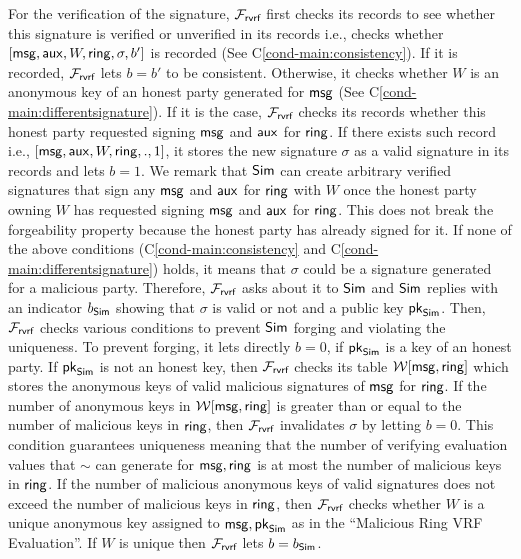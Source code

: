 For the verification of the signature, $ \mathcal{F}_{\textsf{rvrf}} $  first checks its records to see whether this signature is verified or unverified in its records i.e., checks  whether $ [\mathsf{msg},\mathsf{aux},W,\mathsf{ring},\sigma, b'] $ is recorded (See  C\ref{cond-main:consistency}). If it is recorded, $ \mathcal{F}_{\textsf{rvrf}} $ lets  $ b = b' $ to be consistent. Otherwise, it checks whether $ W $ is an anonymous key of an honest party generated for $ \mathsf{msg} $ (See C\ref{cond-main:differentsignature}). If it is the case, $ \mathcal{F}_{\textsf{rvrf}} $ checks  its records whether this honest party requested signing  $ \mathsf{msg} $ and $ \mathsf{aux} $ for $ \mathsf{ring} $.  If there exists such record i.e., $ [\mathsf{msg}, \mathsf{aux}, W, \mathsf{ring}, ., 1] $, it stores the new signature $ \sigma $ as a valid signature in its records and lets $ b = 1 $. We remark that $ \mathsf{Sim} $ can create arbitrary verified signatures that sign any $ \mathsf{msg} $ and $ \mathsf{aux} $ for $ \mathsf{ring} $ with $ W $ once the honest party owning $ W $ has requested signing $ \mathsf{msg} $ and $ \mathsf{aux} $ for $ \mathsf{ring} $. This does not break the forgeability property because the honest party has already signed for it. 
If none of the above conditions (C\ref{cond-main:consistency} and C\ref{cond-main:differentsignature}) holds, it means that $ \sigma $ could be a signature generated for a malicious party. Therefore, $ \mathcal{F}_{\textsf{rvrf}} $ asks about it to $ \mathsf{Sim} $ and $ \mathsf{Sim} $ replies with an indicator $ b_{\mathsf{Sim}} $ showing that $ \sigma  $ is valid or not and a public key $ \mathsf{pk}_{\mathsf{Sim}} $. Then, $ \mathcal{F}_{\textsf{rvrf}} $ checks various conditions to prevent $ \mathsf{Sim} $ forging and violating the uniqueness. To prevent forging, it lets  directly $ b = 0 $, if $ \mathsf{pk}_{\mathsf{Sim}} $ is a key of an honest party. If $ \mathsf{pk}_{\mathsf{Sim}} $ is not an honest key, then $ \mathcal{F}_{\textsf{rvrf}} $ checks its table $ \mathcal{W}[\mathsf{msg},\mathsf{ring}] $ which stores the anonymous keys of valid malicious signatures of $ \mathsf{msg} $ for $ \mathsf{ring} $. If the number of anonymous keys in $ \mathcal{W}[\mathsf{msg},\mathsf{ring}] $ is greater than or equal to the number of malicious keys in $ \mathsf{ring} $, then $ \mathcal{F}_{\textsf{rvrf}} $ invalidates $ \sigma $ by letting $ b = 0 $. This condition guarantees  uniqueness meaning that the number of verifying evaluation values that $ \sim $ can generate for $ \mathsf{msg}, \mathsf{ring} $ is at most the  number of malicious keys in $ \mathsf{ring} $. If the number of malicious anonymous keys of valid signatures does not exceed the number of malicious keys in $ \mathsf{ring} $, then $ \mathcal{F}_{\textsf{rvrf}} $ checks whether $ W $ is a unique anonymous key assigned to $ \mathsf{msg},\mathsf{pk}_{\mathsf{Sim}} $ as in the ``Malicious Ring VRF Evaluation''. If $ W $ is unique then $ \mathcal{F}_{\textsf{rvrf}} $ lets $ b = b_{\mathsf{Sim}} $.

